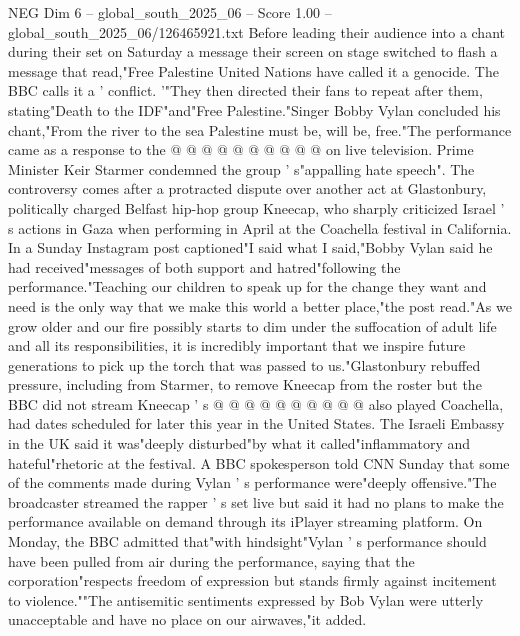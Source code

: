 \begin{textsample}{NEG Dim 6 – global\_south\_2025\_06 – Score 1.00 – global\_south\_2025\_06/126465921.txt}
Before leading their audience into a chant during their set on Saturday a message their screen on stage switched to flash a message that read,"Free Palestine United Nations have called it a genocide.
The BBC calls it a ' conflict. '"They then directed their fans to repeat after them, stating"Death to the IDF"and"Free Palestine."Singer Bobby Vylan concluded his chant,"From the river to the sea Palestine must be, will be, free."The performance came as a response to the @ @ @ @ @ @ @ @ @ @ on live television.
Prime Minister Keir Starmer condemned the group ' s"appalling hate speech".
The controversy comes after a protracted dispute over another act at Glastonbury, politically charged Belfast hip-hop group Kneecap, who sharply criticized Israel ' s actions in Gaza when performing in April at the Coachella festival in California.
In a Sunday Instagram post captioned"I said what I said,"Bobby Vylan said he had received"messages of both support and hatred"following the performance."Teaching our children to speak up for the change they want and need is the only way that we make this world a better place,"the post read."As we grow older and our fire possibly starts to dim under the suffocation of adult life and all its responsibilities, it is incredibly important that we inspire future generations to pick up the torch that was passed to us."Glastonbury rebuffed pressure, including from Starmer, to remove Kneecap from the roster but the BBC did not stream Kneecap ' s @ @ @ @ @ @ @ @ @ @ also played Coachella, had dates scheduled for later this year in the United States.
The Israeli Embassy in the UK said it was"deeply disturbed"by what it called"inflammatory and hateful"rhetoric at the festival.
A BBC spokesperson told CNN Sunday that some of the comments made during Vylan ' s performance were"deeply offensive."The broadcaster streamed the rapper ' s set live but said it had no plans to make the performance available on demand through its iPlayer streaming platform.
On Monday, the BBC admitted that"with hindsight"Vylan ' s performance should have been pulled from air during the performance, saying that the corporation"respects freedom of expression but stands firmly against incitement to violence.""The antisemitic sentiments expressed by Bob Vylan were utterly unacceptable and have no place on our airwaves,"it added.

\end{textsample}
